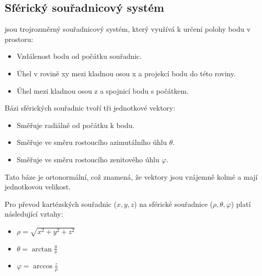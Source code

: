 \documentclass[letterpaper,10pt,english]{jupyterBook}
\begin{document}
\subsection{Sférický souřadnicový systém}
\label{\detokenize{Prednasky/0_3_Sou_u0159adnicov_xe9_syst_xe9my:sfericky-souradnicovy-system}}
\sphinxAtStartPar
{} jsou trojrozměrný souřadnicový systém, který využívá k určení polohy bodu v prostoru:
\begin{itemize}
\item {} 
\sphinxAtStartPar
{} Vzdálenost bodu od počátku souřadnic.

\item {} 
\sphinxAtStartPar
{} Úhel v rovině xy mezi kladnou osou x a projekcí bodu do této roviny.

\item {} 
\sphinxAtStartPar
{} Úhel mezi kladnou osou z a spojnicí bodu s počátkem.

\end{itemize}

\sphinxAtStartPar
{}

\sphinxAtStartPar
{}

\sphinxAtStartPar
Bázi sférických souřadnic tvoří tři jednotkové vektory:
\begin{itemize}
\item {} 
\sphinxAtStartPar
{} Směřuje radiálně od počátku k bodu.

\item {} 
\sphinxAtStartPar
{} Směřuje ve směru rostoucího azimutálního úhlu \(\theta\).

\item {} 
\sphinxAtStartPar
{} Směřuje ve směru rostoucího zenitového úhlu \(\varphi\).

\end{itemize}

\sphinxAtStartPar
Tato báze je ortonormální, což znamená, že vektory jsou vzájemně kolmé a mají jednotkovou velikost.

\sphinxAtStartPar
{}

\sphinxAtStartPar
Pro převod kartézských souřadnic (\(x, y, z\)) na sférické souřadnice (\(\rho, \theta, \varphi\)) platí následující vztahy:
\begin{itemize}
\item {} 
\sphinxAtStartPar
\(\rho = \sqrt{x^2 + y^2 + z^2}\)

\item {} 
\sphinxAtStartPar
\(\theta = \arctan{\frac{y}{x}}\)

\item {} 
\sphinxAtStartPar
\(\varphi = \arccos{\frac{z}{\rho}}\)

\end{itemize}
\end{document}
